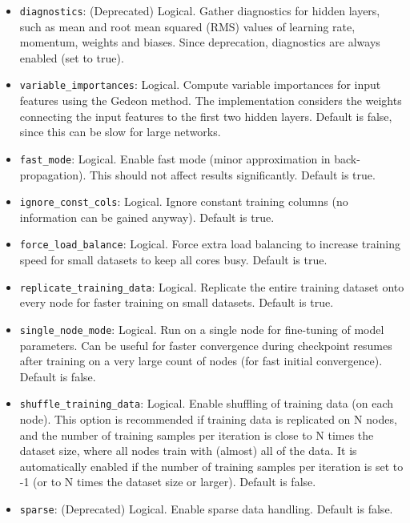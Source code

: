 \begin{itemize}
\item \texttt{diagnostics}: (Deprecated) Logical. Gather diagnostics for hidden layers, such as mean and root mean squared (RMS) values of learning rate, momentum, weights and biases. Since deprecation, diagnostics are always enabled (set to true).

\item \texttt{variable\_importances}: Logical. Compute variable importances for input features using the Gedeon method. The implementation considers the weights connecting the input features to the first two hidden layers. Default is false, since this can be slow for large networks. 

\item \texttt{fast\_mode}: Logical. Enable fast mode (minor approximation in back-propagation).  This should not affect results significantly. Default is true.

\item \texttt{ignore\_const\_cols}: Logical. Ignore constant training columns (no information can be gained anyway). Default is true.

\item \texttt{force\_load\_balance}:  Logical. Force extra load balancing to increase training speed for small datasets to keep all cores busy. Default is true.

\item \texttt{replicate\_training\_data}:  Logical. Replicate the entire training dataset onto every node for faster training on small datasets. Default is true.

\item \texttt{single\_node\_mode}:  Logical. Run on a single node for fine-tuning of model parameters. Can be useful for faster convergence during checkpoint resumes after training on a very large count of nodes (for fast initial convergence). Default is false.

\item \texttt{shuffle\_training\_data}: Logical.  Enable shuffling of training data (on each node). This option is recommended if training data is replicated on N nodes, and the number of training samples per iteration is close to N times the dataset size, where all nodes train with (almost) all of the data. It is automatically enabled if the number of training samples per iteration is set to -1 (or to N times the dataset size or larger).  Default is false.

\item \texttt{sparse}: (Deprecated) Logical. Enable sparse data handling.%
Default is false.


\end{itemize}
